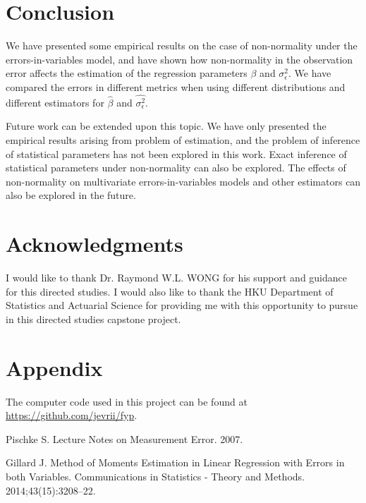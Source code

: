 \documentclass{article}
\begin{document}
\section{Conclusion}

We have presented some empirical results on the case of non-normality under the errors-in-variables model,
and have shown how non-normality in the observation error affects the estimation of the regression parameters $\beta$ and $\sigma^2_\epsilon$. 
We have compared the errors in different metrics when using different distributions and different estimators for $\hat{\beta}$ and $\hat{\sigma^2_\epsilon}$.

Future work can be extended upon this topic.
We have only presented the empirical results arising from problem of estimation,
and the problem of inference of statistical parameters has not been explored in this work.
Exact inference of statistical parameters under non-normality can also be explored.
The effects of non-normality on multivariate errors-in-variables models and other estimators can also be explored in the future.

\section{Acknowledgments}

I would like to thank Dr. Raymond W.L. WONG for his support and guidance for this directed studies.
I would also like to thank the HKU Department of Statistics and Actuarial Science for providing me with this opportunity to pursue in this directed studies capstone project.

\section{Appendix}

The computer code used in this project can be found at \url{https://github.com/jevrii/fyp}.



\begin{thebibliography}{9}

    Pischke S. Lecture Notes on Measurement Error. 2007.

    Gillard J. Method of Moments Estimation in Linear Regression with Errors in both Variables. Communications in Statistics - Theory and Methods. 2014;43(15):3208–22.
\end{thebibliography}
\end{document}
